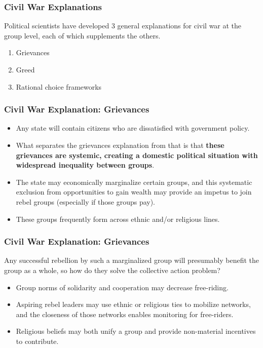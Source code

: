 \documentclass{beamer}
\begin{document}
\begin{frame} 
\frametitle{\LARGE{Civil War Explanations}}
Political scientists have developed 3 general explanations for civil war at the group level, each of which supplements the others.
\begin{enumerate}
		\item Grievances
		\item Greed
		\item Rational choice frameworks
\end{enumerate}
\end{frame}

\begin{frame} 
	\frametitle{\LARGE{Civil War Explanation: Grievances}}
	\begin{itemize}
		\item Any state will contain citizens who are dissatisfied with government policy. \pause
		\item What separates the grievances explanation from that is that \textbf{these grievances are systemic, creating a domestic political situation with widespread inequality between groups}. \pause
		\item The state may economically marginalize certain groups, and this systematic exclusion from opportunities to gain wealth may provide an impetus to join rebel groups (especially if those groups pay). \pause
		\item These groups frequently form across ethnic and/or religious lines.
	\end{itemize}
\end{frame}

\begin{frame} 
	\frametitle{\LARGE{Civil War Explanation: Grievances}}
Any successful rebellion by such a marginalized group will presumably benefit the group as a whole, so how do they solve the collective action problem?
	\begin{itemize}
		\item Group norms of solidarity and cooperation may decrease free-riding. \pause
		\item Aspiring rebel leaders may use ethnic or religious ties to mobilize networks, and the closeness of those networks enables monitoring for free-riders. \pause
		\item Religious beliefs may both unify a group and provide non-material incentives to contribute.
	\end{itemize}
\end{frame}
\end{document}
